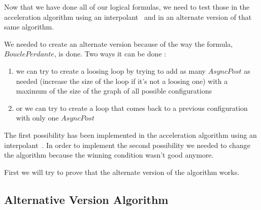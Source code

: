 \documentclass{article}
\begin{document}
Now that we have done all of our logical formulas, we need to test those in the acceleration algorithm using an interpolant~\cite{algo} and in an alternate version of that same algorithm.

We needed to create an alternate version because of the way the formula, $BouclePerdante$, is done. Two ways it can be done :
\begin{enumerate}
    \item we can try to create a loosing loop by trying to add as many $AsyncPost$ as needed (increase the size of the loop if it's not a loosing one) with a maximum of the size of the graph of all possible configurations
    \item or we can try to create a loop that comes back to a previous configuration with only one $AsyncPost$
\end{enumerate}

The first possibility has been implemented in the acceleration algorithm using an interpolant~\cite{algo}. In order to implement the second possibility we needed to change the algorithm because the winning condition wasn't good anymore.

First we will try to prove that the alternate version of the algorithm works.

\subsection{Alternative Version Algorithm}

\begin{algorithm}
\end{algorithm}
\newpage
\end{document}
